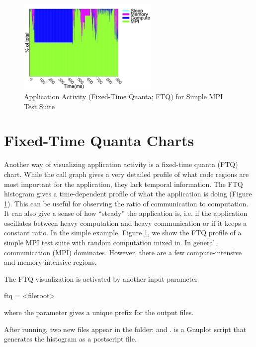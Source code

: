 

\begin{figure}[h!]
\centering
\includegraphics[width=0.6\textwidth]{figures/gnuplot/ftq/ftq.png}
\caption{Application Activity (Fixed-Time Quanta; FTQ) for Simple MPI Test Suite}
\label{fig:ftq}
\end{figure}
\section{Fixed-Time Quanta Charts}
\label{sec:tutorials:ftq}
Another way of visualizing application activity is a fixed-time quanta (FTQ) chart.
While the call graph gives a very detailed profile of what code regions are most important for the application, they lack temporal information.
The FTQ histogram gives a time-dependent profile of what the application is doing (Figure \ref{fig:ftq}).
This can be useful for observing the ratio of communication to computation.
It can also give a sense of how ``steady'' the application is, 
i.e. if the application oscillates between heavy computation and heavy communication or if it keeps a constant ratio.
In the simple example, Figure \ref{fig:ftq}, we show the FTQ profile of a simple MPI test suite with random computation mixed in.
In general, communication (MPI) dominates.  However, there are a few compute-intensive and memory-intensive regions.

The FTQ visualization is activated by another input parameter

\begin{ViFile}
ftq = <fileroot>
\end{ViFile}

where the  parameter gives a unique prefix for the output files. 

After running, two new files appear in the folder:  and .
 is a Gnuplot script that generates the histogram as a postscript file.

